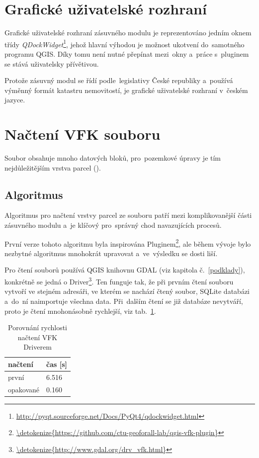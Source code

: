 \section{Grafické uživatelské rozhraní}
\label{gui}

Grafické uživatelské rozhraní zásuvného modulu je reprezentováno jedním oknem třídy \textit{QDockWidget}\footnote{\url{http://pyqt.sourceforge.net/Docs/PyQt4/qdockwidget.html}}, jehož hlavní výhodou je možnost ukotvení do~samotného programu QGIS. Díky tomu není nutné přepínat mezi~okny a~práce s~pluginem se stává uživatelsky přívětivou. 

Protože zásuvný modul se řídí podle~legislativy České republiky a~používá výměnný formát katastru nemovitostí, je grafické uživatelské rozhraní v~českém jazyce. 

\section{Načtení VFK souboru}
\label{nacteni_vfk}

Soubor  obsahuje mnoho datových bloků, pro~pozemkové úpravy je tím nejdůležitějším vrstva parcel (\texttt{}).

\subsection{Algoritmus}
\label{nacteni_vfk_algoritmus}

Algoritmus pro načtení vrstvy parcel ze souboru  patří mezi komplikovanější části zásuvného modulu a~je klíčový pro~správný chod navazujících procesů.

První verze tohoto algoritmu byla inspirována  Pluginem\footnote{\url{\detokenize{https://github.com/ctu-geoforall-lab/qgis-vfk-plugin}}}, ale během vývoje bylo nezbytné algoritmus mnohokrát upravovat a~ve~výsledku se dosti liší.

Pro čtení  souborů používá QGIS knihovnu GDAL (viz kapitola č.~\ref{podklady}), konkrétně se jedná o  Driver\footnote{\url{\detokenize{http://www.gdal.org/drv_vfk.html}}}. Ten funguje tak, že při prvním čtení souboru vytvoří ve stejném adresáři, ve kterém se nachází čtený  soubor, SQLite databázi a~do~ní naimportuje všechna data. Při~dalším čtení se již databáze nevytváří, proto je čtení mnohonásobně rychlejší, viz tab.~\ref{tab:nacteni_vfk_driver}. 

\begin{table}[H]
    \begin{tabular}{|l|l|}
        \hline
         načtení & čas [s] \\
        \hline
        \hline
         první & 6.516 \\ \hline
         opakované & 0.160 \\
         \hline
    \end{tabular}
    \centering
    \caption[Porovnání rychlosti načtení VFK Driverem]{Porovnání rychlosti načtení VFK Driverem}
    \label{tab:nacteni_vfk_driver}
\end{table}

